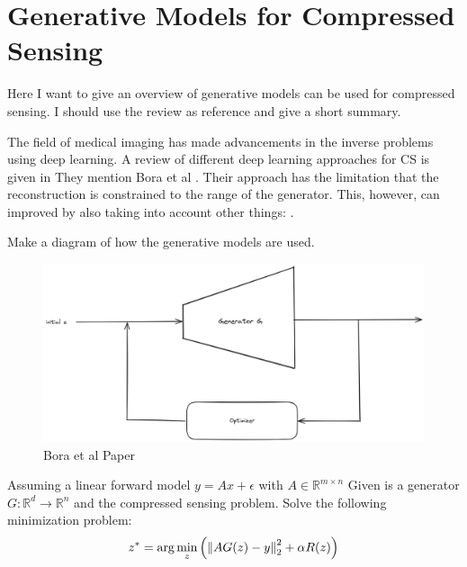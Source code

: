 \section{Generative Models for Compressed Sensing}
Here I want to give an overview of generative models can be used for compressed sensing.
I should use the review as reference and give a short summary.

The field of medical imaging has made advancements in the inverse problems using deep learning.
A review of different deep learning approaches for CS is given in \parencite{ReviewCSUsingAI}
They mention Bora et al \parencite{CSUsingAI}.
Their approach has the limitation that the reconstruction is constrained to the range of the generator.
This, however, can improved by also taking into account other things: \parencite{SparseCSUsingAI}.

Make a diagram of how the generative models are used.
\begin{figure}[h!]
    \centering
    \includegraphics[width=\textwidth]{figures/02_related_work/bora_et_al.png}
    \caption{Bora et al Paper}
\end{figure}

Assuming a linear forward model $y = Ax + \epsilon$ with $A \in \mathbb{R}^{m \times n}$
Given is a generator $G: \mathbb{R}^d \to \mathbb{R}^n$ and the compressed sensing problem.
Solve the following minimization problem:
\begin{equation}
    z^* = \arg\min_{z}{\left( \left\lVert A G(z) - y\right\rVert_2^2 + \alpha R(z) \right)}
\end{equation}

